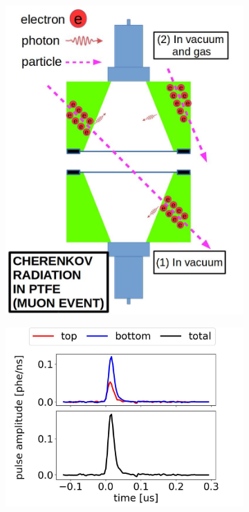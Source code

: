 \begin{figure}[!p]
\begin{subfigure}[b]{.4\textwidth}
		\includegraphics[width=\figurewidth,clip,trim={0 0 0 0},angle=0,origin=c]{Figures/GasTest/WeiDrawEvent/MuonVac.jpg}
		\caption{}
		\label{fig:}
	\end{subfigure}
	\par\bigskip
	\begin{subfigure}[b]{0.6\textwidth}
		\centering
		\includegraphics[width=\figurewidth,clip,trim={0 0 0 0}]{Figures/GasTest/exampleWaveforms/proc64767id00000002.jpg}%

\end{subfigure}
\end{figure}
